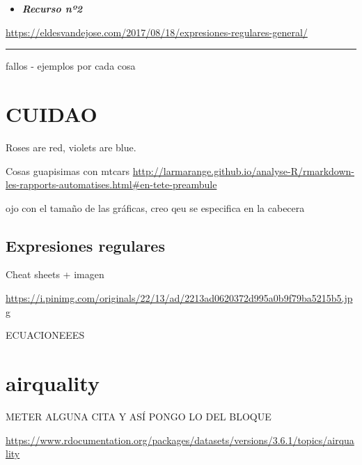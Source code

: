\documentclass[]{article}
\providecommand{\tightlist}{%
  \setlength{\itemsep}{0pt}\setlength{\parskip}{0pt}}
\begin{document}
\begin{itemize}
\tightlist
\item
  \textbf{\emph{Recurso nº2}}
\end{itemize}

\url{https://eldesvandejose.com/2017/08/18/expresiones-regulares-general/}

\begin{center}\rule{0.5\linewidth}{\linethickness}\end{center}

fallos - ejemplos por cada cosa

\hypertarget{cuidao}{%
\section{CUIDAO}\label{cuidao}}

Roses are {red}, violets are {blue}.

Cosas guapisimas con mtcars
\url{http://larmarange.github.io/analyse-R/rmarkdown-les-rapports-automatises.html\#en-tete-preambule}

ojo con el tamaño de las gráficas, creo qeu se especifica en la cabecera

\hypertarget{expresiones-regulares-1}{%
\subsection{Expresiones regulares}\label{expresiones-regulares-1}}

Cheat sheets + imagen

\url{https://i.pinimg.com/originals/22/13/ad/2213ad0620372d995a0b9f79ba5215b5.jpg}

ECUACIONEEES

\hypertarget{airquality}{%
\section{airquality}\label{airquality}}

METER ALGUNA CITA Y ASÍ PONGO LO DEL BLOQUE

\url{https://www.rdocumentation.org/packages/datasets/versions/3.6.1/topics/airquality}
\end{document}
